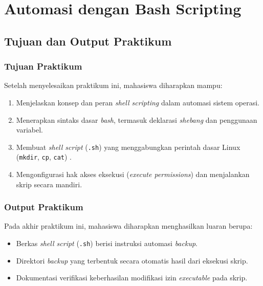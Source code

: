 
\chapter{Automasi dengan Bash Scripting}
\label{chap:modul-04}

\section{Tujuan dan Output Praktikum}

\subsection{Tujuan Praktikum}
Setelah menyelesaikan praktikum ini, mahasiswa diharapkan mampu:
\begin{enumerate}
    \item Menjelaskan konsep dan peran \textit{shell scripting} dalam automasi sistem operasi.
    \item Menerapkan sintaks dasar \textit{bash}, termasuk deklarasi \textit{shebang} dan penggunaan variabel.
    \item Membuat \textit{shell script} (\texttt{.sh}) yang menggabungkan perintah dasar Linux (\texttt{mkdir}, \texttt{cp}, \texttt{cat}) \cite{shotts2019linux}.
    \item Mengonfigurasi hak akses eksekusi (\textit{execute permissions}) dan menjalankan skrip secara mandiri.
\end{enumerate}

\subsection{Output Praktikum}
Pada akhir praktikum ini, mahasiswa diharapkan menghasilkan luaran berupa:
\begin{itemize}
    \item Berkas \textit{shell script} (\texttt{.sh}) berisi instruksi automasi \textit{backup}.
    \item Direktori \textit{backup} yang terbentuk secara otomatis hasil dari eksekusi skrip.
    \item Dokumentasi verifikasi keberhasilan modifikasi izin \textit{executable} pada skrip.
\end{itemize}

